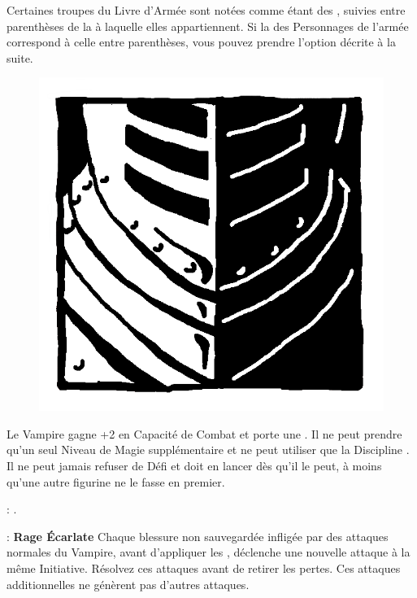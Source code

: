
Certaines troupes du Livre d'Armée sont notées comme étant des \bloodties{}, suivies entre parenthèses de la \bloodline{} à laquelle elles appartiennent. Si la \bloodline{} des Personnages \vampires{} de l'armée correspond à celle entre parenthèses, vous pouvez prendre l'option décrite à la suite.


\begin{figure}
\centering
\includegraphics[width=\logosize]{pics/logo_brotherhood.png}
\end{figure}
Le Vampire gagne +2 en Capacité de Combat et porte une \platearmour{}. Il ne peut prendre qu'un seul Niveau de Magie supplémentaire et ne peut utiliser que la Discipline \necromancy{}. Il ne peut jamais refuser de Défi et doit en lancer dès qu'il le peut, à moins qu'une autre figurine ne le fasse en premier.

\vspace{0.5cm}
\bloodtie{} : \textbf{\vampireknights{}}.

\vspace{0.5cm}
\ancientbloodpower{} : \textbf{Rage Écarlate}\dotfill{}\newline%
Chaque blessure non sauvegardée infligée par des attaques normales du Vampire, avant d'appliquer les \multiplewounds{}{}, déclenche une nouvelle attaque à la même Initiative. Résolvez ces attaques avant de retirer les pertes. Ces attaques additionnelles ne génèrent pas d'autres attaques.

